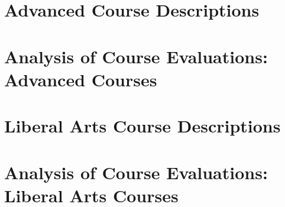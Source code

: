 \documentclass[../../main.tex]{subfiles}
\begin{document}
\section{Advanced Course Descriptions}
\label{sec:adv}

%

\begin{flushleft}

\end{flushleft}

\section{Analysis of Course Evaluations: Advanced Courses}
\label{sec:adv_eval}

%

\begin{flushleft}

\end{flushleft}

\section{Liberal Arts Course Descriptions}
\label{sec:lib}

%

\begin{flushleft}

\end{flushleft}

\section{Analysis of Course Evaluations: Liberal Arts Courses}
\label{sec:lib_eval}
%

\begin{flushleft}

\end{flushleft}
\end{document}
